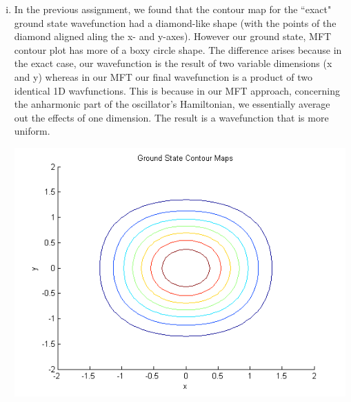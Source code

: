 \documentclass{article}
\begin{document}
\begin{enumerate}[i)]
  \item In the previous assignment, we found that the contour map for the ``exact" ground state wavefunction had a diamond-like shape (with the points of the diamond aligned aling the x- and y-axes). However our ground state, MFT contour plot has more of a boxy circle shape. The difference arises because in the exact case, our wavefunction is the result of two variable dimensions (x and y) whereas in our MFT our final wavefunction is a product of two identical 1D wavfunctions. This is because in our MFT approach, concerning the anharmonic part of the oscillator's Hamiltonian, we essentially average out the effects of one dimension. The result is a wavefunction that is more uniform.

    \begin{center}
      \includegraphics[scale=0.5]{prob1part5}
    \end{center}
\end{enumerate}
\end{document}
